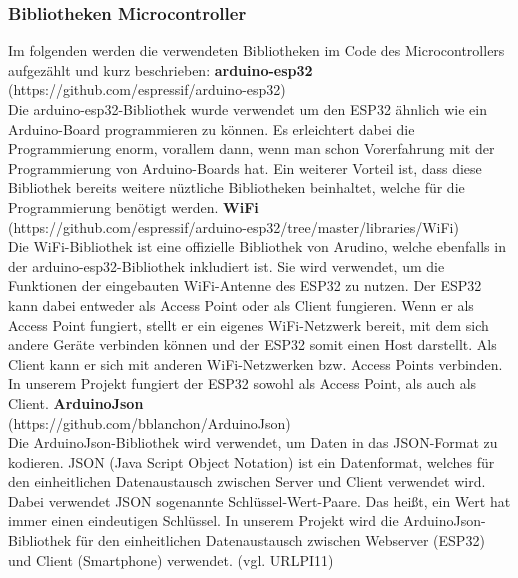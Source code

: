 \documentclass[11pt, twoside]{article}
\begin{document}
\subsubsection{Bibliotheken Microcontroller}
Im folgenden werden die verwendeten Bibliotheken im Code des Microcontrollers aufgezählt und kurz beschrieben:
\vspace{4mm}\newline
\textbf{arduino-esp32} \\
(https://github.com/espressif/arduino-esp32) \\
Die arduino-esp32-Bibliothek wurde verwendet um den ESP32 ähnlich wie ein Arduino-Board programmieren zu können. Es erleichtert dabei die Programmierung enorm, vorallem dann, wenn man schon Vorerfahrung mit der Programmierung von Arduino-Boards hat. Ein weiterer Vorteil ist, dass diese Bibliothek bereits weitere nüztliche Bibliotheken beinhaltet, welche für die Programmierung benötigt werden.
\vspace{4mm}\newline
\textbf{WiFi} \\
(https://github.com/espressif/arduino-esp32/tree/master/libraries/WiFi) \\
Die WiFi-Bibliothek ist eine offizielle Bibliothek von Arudino, welche ebenfalls in der arduino-esp32-Bibliothek inkludiert ist. Sie wird verwendet, um die Funktionen der eingebauten WiFi-Antenne des ESP32 zu nutzen. Der ESP32 kann dabei entweder als Access Point oder als Client fungieren. Wenn er als Access Point fungiert, stellt er ein eigenes WiFi-Netzwerk bereit, mit dem sich andere Geräte verbinden können und der ESP32 somit einen Host darstellt. Als Client kann er sich mit anderen WiFi-Netzwerken bzw. Access Points verbinden. In unserem Projekt fungiert der ESP32 sowohl als Access Point, als auch als Client.
\vspace{4mm}\newline
\textbf{ArduinoJson} \\
(https://github.com/bblanchon/ArduinoJson) \\
Die ArduinoJson-Bibliothek wird verwendet, um Daten in das JSON-Format zu kodieren. JSON (Java Script Object Notation) ist ein Datenformat, welches  für den einheitlichen Datenaustausch zwischen Server und Client verwendet wird. Dabei verwendet JSON sogenannte Schlüssel-Wert-Paare. Das heißt, ein Wert hat immer einen eindeutigen Schlüssel. In unserem Projekt wird die ArduinoJson-Bibliothek für den einheitlichen Datenaustausch zwischen Webserver (ESP32) und Client (Smartphone) verwendet. (vgl. URLPI11)
\end{document}

